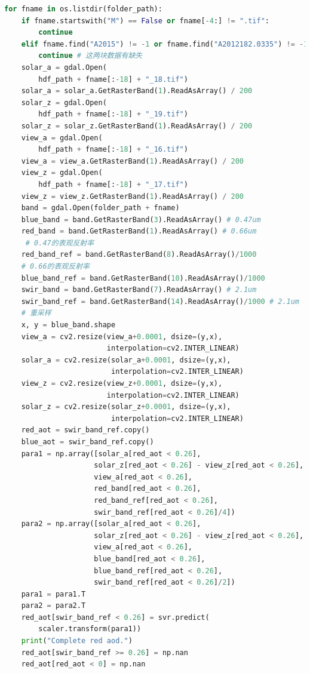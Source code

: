\documentclass{ctexart}
\begin{document}
\begin{sloppypar}
\begin{appendices}
\begin{lstlisting}[frame=single, language=Python, basicstyle={\ttfamily}, label=fit, caption={计算AOD}]
for fname in os.listdir(folder_path):
    if fname.startswith("M") == False or fname[-4:] != ".tif":
        continue
    elif fname.find("A2015") != -1 or fname.find("A2012182.0335") != -1:
        continue # 这两块数据有缺失
    solar_a = gdal.Open(
        hdf_path + fname[:-18] + "_18.tif")
    solar_a = solar_a.GetRasterBand(1).ReadAsArray() / 200
    solar_z = gdal.Open(
        hdf_path + fname[:-18] + "_19.tif")
    solar_z = solar_z.GetRasterBand(1).ReadAsArray() / 200
    view_a = gdal.Open(
        hdf_path + fname[:-18] + "_16.tif")
    view_a = view_a.GetRasterBand(1).ReadAsArray() / 200
    view_z = gdal.Open(
        hdf_path + fname[:-18] + "_17.tif")
    view_z = view_z.GetRasterBand(1).ReadAsArray() / 200
    band = gdal.Open(folder_path + fname)
    blue_band = band.GetRasterBand(3).ReadAsArray() # 0.47um
    red_band = band.GetRasterBand(1).ReadAsArray() # 0.66um
     # 0.47的表观反射率
    red_band_ref = band.GetRasterBand(8).ReadAsArray()/1000
    # 0.66的表观反射率
    blue_band_ref = band.GetRasterBand(10).ReadAsArray()/1000
    swir_band = band.GetRasterBand(7).ReadAsArray() # 2.1um
    swir_band_ref = band.GetRasterBand(14).ReadAsArray()/1000 # 2.1um
    # 重采样
    x, y = blue_band.shape
    view_a = cv2.resize(view_a+0.0001, dsize=(y,x), 
                        interpolation=cv2.INTER_LINEAR)
    solar_a = cv2.resize(solar_a+0.0001, dsize=(y,x), 
                         interpolation=cv2.INTER_LINEAR)
    view_z = cv2.resize(view_z+0.0001, dsize=(y,x), 
                        interpolation=cv2.INTER_LINEAR)
    solar_z = cv2.resize(solar_z+0.0001, dsize=(y,x), 
                         interpolation=cv2.INTER_LINEAR)
    red_aot = swir_band_ref.copy()
    blue_aot = swir_band_ref.copy()
    para1 = np.array([solar_a[red_aot < 0.26], 
                     solar_z[red_aot < 0.26] - view_z[red_aot < 0.26], 
                     view_a[red_aot < 0.26], 
                     red_band[red_aot < 0.26], 
                     red_band_ref[red_aot < 0.26], 
                     swir_band_ref[red_aot < 0.26]/4])
    para2 = np.array([solar_a[red_aot < 0.26], 
                     solar_z[red_aot < 0.26] - view_z[red_aot < 0.26], 
                     view_a[red_aot < 0.26], 
                     blue_band[red_aot < 0.26], 
                     blue_band_ref[red_aot < 0.26], 
                     swir_band_ref[red_aot < 0.26]/2])
    para1 = para1.T
    para2 = para2.T
    red_aot[swir_band_ref < 0.26] = svr.predict(
        scaler.transform(para1))
    print("Complete red aod.")
    red_aot[swir_band_ref >= 0.26] = np.nan
    red_aot[red_aot < 0] = np.nan

\end{lstlisting}
\end{appendices}
\end{sloppypar}
\end{document}
